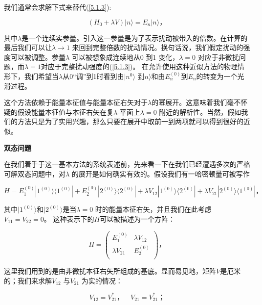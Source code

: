 ﻿\documentclass[UTF8,twoside]{ctexart}
\begin{document}
我们通常会求解下式来替代(\ref{5.1.3}):

\begin{equation} \label{5.1.4}
(H_0 + \lambda V)|n\rangle = E_n|n\rangle\text{，}
\end{equation}

\noindent 其中$\lambda$是一个连续实参量。引入这一参量是为了表示扰动被带入的倍数。在计算的最后我们可以让$\lambda \rightarrow 1$ 来回到完整倍数的扰动情况。换句话说，我们假定扰动的强度可以被调整。参量$\lambda$ 可以被想象成连续地从0 到1 变化，$\lambda = 0$ 对应于非微扰问题，而$\lambda = 1$对应于完整扰动强度的(\ref{5.1.3})。 在允许使用这种近似方法的物理情形下，我们希望当$\lambda$从0“调”到1时看到由$|n^0\rangle$ 到$n\rangle$和由$E_n^{(0)}$到$E_n$的转变为一个光滑过程。

这个方法依赖于能量本征值与能量本征右矢对于$\lambda$的幂展开。这意味着我们毫不怀疑的假设能量本征值与本征右矢在复$\lambda$-平面上$\lambda = 0$ 附近的解析性。当然，假如我们的方法只是为了实用兴趣，那么只要在展开中取前一到两项就可以得到很好的近似。


\noindent \textbf{双态问题}

\noindent 在我们着手于这一基本方法的系统表述前，先来看一下在我们已经遭遇多次的严格可解双态问题中，对$\lambda$ 的展开是如何确实有效的。假设我们有一哈密顿量可被写作

\begin{equation} \label{5.1.5}
H = E_{1}^{(0)}|1^{(0)}\rangle\langle1^{(0)}| + E_{2}^{(0)}|2^{(0)}\rangle\langle2^{(0)}| + \lambda V_{12}|1^{(0)}\rangle\langle 2^{(0)}| +  \lambda V_{21}|2^{(0)}\rangle\langle1^{(0)}|\text{，}
\end{equation}

\noindent 其中$|1^{(0)}\rangle$和$|2^{(0)}\rangle$是当$\lambda = 0$ 时的能量本征右矢，并且我们在此考虑$V_{11} = V_{22} = 0$。 这种表示下的$H$可以被描述为一个方阵：

\begin{equation} \label{5.1.6}
H = \left( \begin{array}{cc}
E_1^{(0)} & \lambda V_{12} \\
\lambda V_{21} & E_2^{(0)} \\
\end{array} \right)\text{，}
\end{equation}

\noindent 这里我们用到的是由非微扰本征右矢所组成的基底。显而易见地，矩阵$V$是厄米的；我们来求解$V_{12}$ 与$V_{21}$ 为实的情况：

\begin{equation} \label{5.1.7}
V_{12} = V_{21}^{\ast}\text{，}\quad V_{21}=V_{21}^{\ast}\text{；}
\end{equation}
\end{document}

